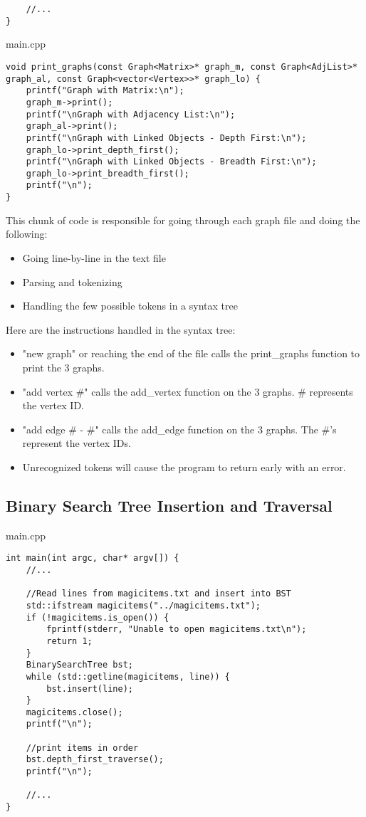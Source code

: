 \documentclass[letterpaper, 10pt,DIV=13]{scrartcl}
\numberwithin{equation}{section} %
\numberwithin{figure}{section} %
\numberwithin{table}{section} %
\begin{document}
\begin{verbatim}
    //...
}
\end{verbatim}

main.cpp
\begin{verbatim}
void print_graphs(const Graph<Matrix>* graph_m, const Graph<AdjList>* graph_al, const Graph<vector<Vertex>>* graph_lo) {
    printf("Graph with Matrix:\n");
    graph_m->print();
    printf("\nGraph with Adjacency List:\n");
    graph_al->print();
    printf("\nGraph with Linked Objects - Depth First:\n");
    graph_lo->print_depth_first();
    printf("\nGraph with Linked Objects - Breadth First:\n");
    graph_lo->print_breadth_first();
    printf("\n");
}
\end{verbatim}

This chunk of code is responsible for going through each graph file and doing the following:
\begin{itemize}
  \item Going line-by-line in the text file
  \item Parsing and tokenizing
  \item Handling the few possible tokens in a syntax tree
\end{itemize}

Here are the instructions handled in the syntax tree:
\begin{itemize}
  \item "new graph" or reaching the end of the file calls the print\_graphs function to print the 3 graphs.
  \item "add vertex \#" calls the add\_vertex function on the 3 graphs. \# represents the vertex ID.
  \item "add edge \# - \#" calls the add\_edge function on the 3 graphs. The \#'s represent the vertex IDs.
  \item Unrecognized tokens will cause the program to return early with an error.
\end{itemize}

\subsection{Binary Search Tree Insertion and Traversal}

main.cpp
\begin{verbatim}
int main(int argc, char* argv[]) {
    //...

    //Read lines from magicitems.txt and insert into BST
    std::ifstream magicitems("../magicitems.txt");
    if (!magicitems.is_open()) {
        fprintf(stderr, "Unable to open magicitems.txt\n");
        return 1;
    }
    BinarySearchTree bst;
    while (std::getline(magicitems, line)) {
        bst.insert(line);
    }
    magicitems.close();
    printf("\n");
    
    //print items in order
    bst.depth_first_traverse();
    printf("\n");

    //...
}
\end{verbatim}
\end{document}
